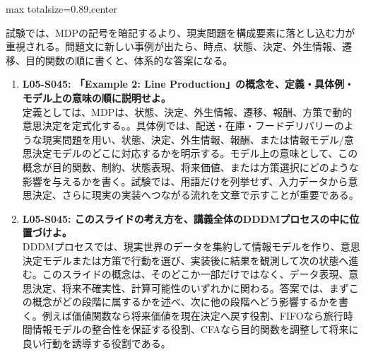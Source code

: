 \begin{minipage}[t]{0.58\textwidth}
\begin{adjustbox}{max totalsize={\textwidth}{0.89\textheight},center}
\begin{minipage}{\textwidth}
試験では、MDPの記号を暗記するより、現実問題を構成要素に落とし込む力が重視される。問題文に新しい事例が出たら、時点、状態、決定、外生情報、遷移、目的関数の順に書くと、体系的な答案になる。\par{}\begin{enumerate}\item \textbf{L05-S045: 「Example 2: Line Production」の概念を、定義・具体例・モデル上の意味の順に説明せよ。}\\定義としては、MDPは、状態、決定、外生情報、遷移、報酬、方策で動的意思決定を定式化する。。具体例では、配送・在庫・フードデリバリーのような現実問題を用い、状態、決定、外生情報、報酬、または情報モデル/意思決定モデルのどこに対応するかを明示する。モデル上の意味として、この概念が目的関数、制約、状態表現、将来価値、または方策選択にどのような影響を与えるかを書く。試験では、用語だけを列挙せず、入力データから意思決定、さらに現実の実装へつながる流れを文章で示すことが重要である。\item \textbf{L05-S045: このスライドの考え方を、講義全体のDDDMプロセスの中に位置づけよ。}\\DDDMプロセスでは、現実世界のデータを集約して情報モデルを作り、意思決定モデルまたは方策で行動を選び、実装後に結果を観測して次の状態へ進む。このスライドの概念は、そのどこか一部だけではなく、データ表現、意思決定、将来不確実性、計算可能性のいずれかに関わる。答案では、まずこの概念がどの段階に属するかを述べ、次に他の段階へどう影響するかを書く。例えば価値関数なら将来価値を現在決定へ戻す役割、FIFOなら旅行時間情報モデルの整合性を保証する役割、CFAなら目的関数を調整して将来に良い行動を誘導する役割である。\end{enumerate}
\end{minipage}
\end{adjustbox}
\end{minipage}



